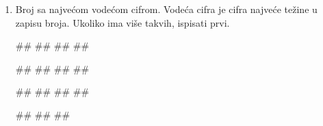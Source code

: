 \begin{Exercise}[label=PET_22]
\begin{enumerate}
\begin{miditest}
\begin{upotreba}{3}
#\naslovInt#
##
#
\end{upotreba}
\end{miditest}
\begin{miditest}
\begin{upotreba}{4}
#\naslovInt#
##
##
\end{upotreba}
\end{miditest}

\begin{miditest}
\begin{upotreba}{5}
#\naslovInt#
##
##
##
\end{upotreba}
\end{miditest}
\begin{miditest}
\begin{upotreba}{6}
#\naslovInt#
##
##
##
\end{upotreba}
\end{miditest}

\item Broj sa najvećom vodećom cifrom. Vodeća cifra je cifra najveće težine u zapisu broja. Ukoliko ima više takvih, ispisati prvi.

\begin{miditest}
\begin{upotreba}{1}
#\naslovInt#
##
##
##
\end{upotreba}
\end{miditest}
\begin{miditest}
\begin{upotreba}{2}
#\naslovInt#
##
##
##
\end{upotreba}
\end{miditest}

\begin{miditest}
\begin{upotreba}{3}
#\naslovInt#
##
##
##
\end{upotreba}
\end{miditest}
\begin{miditest}
\begin{upotreba}{4}
#\naslovInt#
##
##
\end{upotreba}
\end{miditest}

\end{enumerate}

\end{Exercise}
